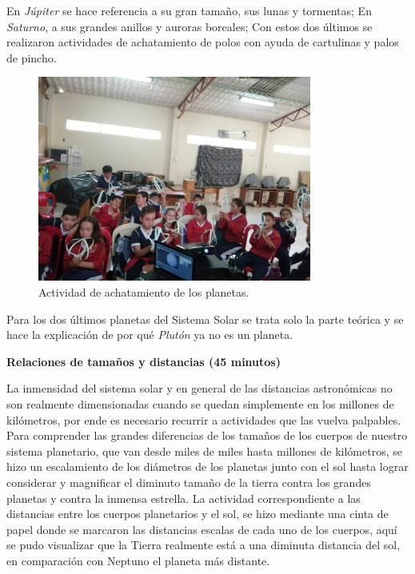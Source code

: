 \documentclass[a4paper,10pt]{article}
\begin{document}
\noindent En \textit{Júpiter} se hace referencia a su gran tamaño, sus lunas y tormentas; En \textit{Saturno}, a sus grandes anillos y auroras boreales; Con estos dos últimos se realizaron actividades de achatamiento de polos con ayuda de cartulinas y palos de pincho. 

\begin{figure}[H]
    \centering
    \includegraphics[width=9cm]{clavellinas/sanluis-achatamiento.jpeg}
    \caption{Actividad de achatamiento de los planetas.}
    \label{fig:my_label}
\end{figure}

\noindent Para los dos últimos planetas del Sistema Solar se trata solo la parte teórica y se hace la explicación de por qué \textit{Plutón} ya no es un planeta.

\vspace{2mm}

\noindent \textbf{Relaciones de tamaños y distancias (45 minutos)}

\vspace{2mm}

\noindent La inmensidad del sistema solar y en general de las distancias astronómicas no son realmente dimensionadas cuando se quedan simplemente en los millones de kilómetros, por ende es necesario recurrir a actividades que las vuelva palpables. Para comprender las grandes diferencias de los tamaños de los cuerpos de nuestro sistema planetario, que van desde miles de miles hasta millones de kilómetros, se hizo un escalamiento de los diámetros de los planetas junto con el sol hasta lograr considerar y magnificar el diminuto tamaño de la tierra contra los grandes planetas y contra la inmensa estrella. La actividad correspondiente a las distancias entre los cuerpos planetarios y el sol, se hizo mediante una cinta de papel donde se marcaron las distancias escalas de cada uno de los cuerpos, aquí se pudo visualizar que la Tierra realmente está a una diminuta distancia del sol, en comparación con Neptuno el planeta más distante.    
\end{document}
